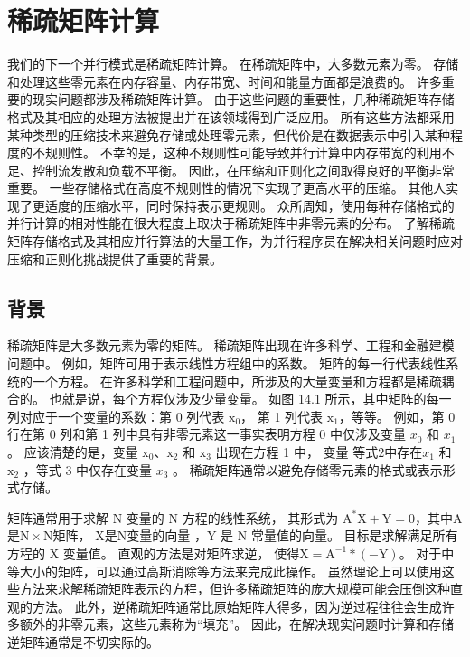 \section{稀疏矩阵计算}
我们的下一个并行模式是稀疏矩阵计算。 在稀疏矩阵中，大多数元素为零。 
存储和处理这些零元素在内存容量、内存带宽、时间和能量方面都是浪费的。 许多重要的现实问题都涉及稀疏矩阵计算。 
由于这些问题的重要性，几种稀疏矩阵存储格式及其相应的处理方法被提出并在该领域得到广泛应用。 
所有这些方法都采用某种类型的压缩技术来避免存储或处理零元素，但代价是在数据表示中引入某种程度的不规则性。 
不幸的是，这种不规则性可能导致并行计算中内存带宽的利用不足、控制流发散和负载不平衡。 
因此，在压缩和正则化之间取得良好的平衡非常重要。 一些存储格式在高度不规则性的情况下实现了更高水平的压缩。 
其他人实现了更适度的压缩水平，同时保持表示更规则。 
众所周知，使用每种存储格式的并行计算的相对性能在很大程度上取决于稀疏矩阵中非零元素的分布。 
了解稀疏矩阵存储格式及其相应并行算法的大量工作，为并行程序员在解决相关问题时应对压缩和正则化挑战提供了重要的背景。

\subsection{背景}
稀疏矩阵是大多数元素为零的矩阵。 稀疏矩阵出现在许多科学、工程和金融建模问题中。 例如，矩阵可用于表示线性方程组中的系数。 
矩阵的每一行代表线性系统的一个方程。 在许多科学和工程问题中，所涉及的大量变量和方程都是稀疏耦合的。 
也就是说，每个方程仅涉及少量变量。 
如图 14.1 所示，其中矩阵的每一列对应于一个变量的系数：第 0 列代表 $\mathrm{x}_{0}$，
第 1 列代表 $\mathrm{x}_{1 }$，等等。 
例如，第 0 行在第 0 列和第 1 列中具有非零元素这一事实表明方程 0 中仅涉及变量 $x_{0}$ 和 $x_{1}$ 。 
应该清楚的是，变量 $\mathrm{x}_{0}、\mathrm{x}_{2}$ 和 $\mathrm{x}_{3}$ 出现在方程 1 中，
变量 $\mathrm 等式 2 中存在 {x}_{1}$ 和 $\mathrm{x}_{2}$ ，等式 3 中仅存在变量 $x_{3}$ 。 
稀疏矩阵通常以避免存储零元素的格式或表示形式存储。

矩阵通常用于求解 $\mathrm{N}$ 变量的 $\mathrm{N}$ 方程的线性系统，
其形式为 $\mathrm{A}^{*} \mathrm{X}+\mathrm{Y }=0$，其中$\mathrm{A}$是$\mathrm{N} \times \mathrm{N}$矩阵，
$\mathrm{X}$是$\mathrm{N}$变量的向量 ，$\mathrm{Y}$ 是 $\mathrm{N}$ 常量值的向量。 
目标是求解满足所有方程的 $\mathrm{X}$ 变量值。 直观的方法是对矩阵求逆，
使得$\mathrm{X}=\mathrm{A}^{-1} *(-\mathrm{Y})$。 对于中等大小的矩阵，可以通过高斯消除等方法来完成此操作。 
虽然理论上可以使用这些方法来求解稀疏矩阵表示的方程，但许多稀疏矩阵的庞大规模可能会压倒这种直观的方法。 
此外，逆稀疏矩阵通常比原始矩阵大得多，因为逆过程往往会生成许多额外的非零元素，这些元素称为“填充”。 
因此，在解决现实问题时计算和存储逆矩阵通常是不切实际的。

